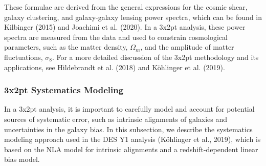 \documentclass[twocolumn]{aastex631}
\begin{document}
These formulae are derived from the general expressions for the cosmic shear, galaxy clustering, and galaxy-galaxy lensing power spectra, which can be found in Kilbinger (2015) and Joachimi et al. (2020). In a 3x2pt analysis, these power spectra are measured from the data and used to constrain cosmological parameters, such as the matter density, $\Omega_m$, and the amplitude of matter fluctuations, $\sigma_8$. For a more detailed discussion of the 3x2pt methodology and its applications, see Hildebrandt et al. (2018) and Köhlinger et al. (2019).

%
%

\subsubsection{3x2pt Systematics Modeling}

In a 3x2pt analysis, it is important to carefully model and account for potential sources of systematic error, such as intrinsic alignments of galaxies and uncertainties in the galaxy bias. In this subsection, we describe the systematics modeling approach used in the DES Y1 analysis (Köhlinger et al., 2019), which is based on the NLA model for intrinsic alignments and a redshift-dependent linear bias model.
\end{document}
